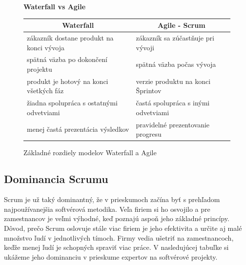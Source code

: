 \documentclass[10pt,slovak,a4paper]{article}
\begin{document}
\begin{figure} [H]
\begin{center}
\textbf{Waterfall vs Agile}
\begin{tabular}{|l|l|}
\hline
\multicolumn{1}{|c|}{Waterfall}                      & \multicolumn{1}{c|}{Agile - Scrum}         \\ \hline
zákazník dostane produkt na konci vývoja & zákazník sa zúčastňuje pri vývoji     \\ \hline
spätná väzba po dokončení projektu        & spätná väzba počas vývoja \\ \hline
produkt je hotový na konci všetkých fáz   & verzie produktu na konci Šprintov \\ \hline
žiadna spolupráca s ostatnými odvetviami             & častá spolupráca s inými odvetviami       \\ \hline
menej častá prezentácia výsledkov                    & pravidelné prezentovanie progresu  \\ \hline
\end{tabular}
\caption{Základné rozdiely modelov Waterfall a Agile~\cite{dima2018waterfall}}
\end{center}
\end{figure}

\subsection{Dominancia Scrumu}

Scrum je už taký dominantný, že v prieskumoch začína byť s prehľadom najpoužívanejšia softvérová metodika. Veľa firiem si ho osvojilo a pre zamestnancov je veľmi výhodné, keď poznajú aspoň jeho základné princípy. Dôvod, prečo Scrum oslovuje stále viac firiem je jeho efektivita a určite aj malé množstvo ľudí v jednotlivých tímoch. Firmy vedia ušetriť na zamestnancoch, keďže menej ľudí je schopných spraviť viac práce. V nasledujúcej tabuľke si ukážeme jeho dominanciu v prieskume expertov na softvérové projekty.
\end{document}
